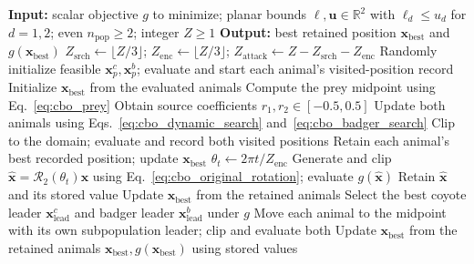 \documentclass[pdflatex,onecolumn,sn-mathphys-num]{sn-jnl}
\begin{document}
\begin{algorithm}[p]
\caption{Planar adaptation of dynamic CBO~\cite{Khatab2025}}\label{alg:original_dynamic_cbo}
\small
\begin{algorithmic}[1]
\Statex \textbf{Input:} scalar objective $g$ to minimize; planar bounds $\boldsymbol{\ell},\mathbf{u}\in\mathbb{R}^2$ with $\ell_d\leq u_d$ for $d=1,2$; even $n_{\mathrm{pop}}\geq2$; integer $Z\geq1$
\Statex \textbf{Output:} best retained position $\mathbf{x}_{\mathrm{best}}$ and $g(\mathbf{x}_{\mathrm{best}})$
\State $Z_{\mathrm{srch}}\leftarrow\lfloor Z/3\rfloor$; $Z_{\mathrm{enc}}\leftarrow\lfloor Z/3\rfloor$; $Z_{\mathrm{attack}}\leftarrow Z-Z_{\mathrm{srch}}-Z_{\mathrm{enc}}$
    \State Randomly initialize feasible $\mathbf{x}_p^c,\mathbf{x}_p^b$; evaluate and start each animal's visited-position record
\EndFor
\State Initialize $\mathbf{x}_{\mathrm{best}}$ from the evaluated animals
        \State Compute the prey midpoint using Eq.~\eqref{eq:cbo_prey}
        \State Obtain source coefficients $r_1,r_2\in[-0.5,0.5]$
        \State Update both animals using Eqs.~\eqref{eq:cbo_dynamic_search} and~\eqref{eq:cbo_badger_search}
        \State Clip to the domain; evaluate and record both visited positions
    \EndFor
\EndFor
\State Retain each animal's best recorded position; update $\mathbf{x}_{\mathrm{best}}$
    \State $\theta_t\leftarrow2\pi t/Z_{\mathrm{enc}}$
        \State Generate and clip $\widehat{\mathbf{x}}=\mathcal{R}_2(\theta_t)\mathbf{x}$ using Eq.~\eqref{eq:cbo_original_rotation}; evaluate $g(\widehat{\mathbf{x}})$
            \State Retain $\widehat{\mathbf{x}}$ and its stored value
        \EndIf
    \EndFor
\EndFor
\State Update $\mathbf{x}_{\mathrm{best}}$ from the retained animals
    \State Select the best coyote leader $\mathbf{x}_{\mathrm{lead}}^c$ and badger leader $\mathbf{x}_{\mathrm{lead}}^b$ under $g$
        \State Move each animal to the midpoint with its own subpopulation leader; clip and evaluate both
    \EndFor
    \State Update $\mathbf{x}_{\mathrm{best}}$ from the retained animals
\EndFor
\State \Return $\mathbf{x}_{\mathrm{best}},g(\mathbf{x}_{\mathrm{best}})$ using stored values
\end{algorithmic}
\end{algorithm}
\end{document}
